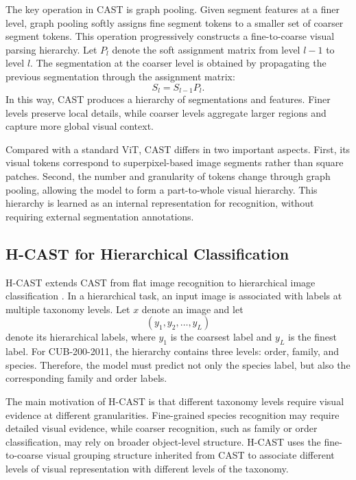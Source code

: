 The key operation in CAST is graph pooling. Given segment features at a finer level, graph pooling softly assigns fine segment tokens to a smaller set of coarser segment tokens. This operation progressively constructs a fine-to-coarse visual parsing hierarchy. Let \(P_l\) denote the soft assignment matrix from level \(l-1\) to level \(l\). The segmentation at the coarser level is obtained by propagating the previous segmentation through the assignment matrix:
\begin{equation}
    S_l = S_{l-1} P_l.
\end{equation}
In this way, CAST produces a hierarchy of segmentations and features. Finer levels preserve local details, while coarser levels aggregate larger regions and capture more global visual context.

Compared with a standard ViT, CAST differs in two important aspects. First, its visual tokens correspond to superpixel-based image segments rather than square patches. Second, the number and granularity of tokens change through graph pooling, allowing the model to form a part-to-whole visual hierarchy. This hierarchy is learned as an internal representation for recognition, without requiring external segmentation annotations.

\subsection{H-CAST for Hierarchical Classification}

H-CAST extends CAST from flat image recognition to hierarchical image classification \cite{park2025visually}. In a hierarchical task, an input image is associated with labels at multiple taxonomy levels. Let \(x\) denote an image and let
\begin{equation}
    (y_1, y_2, \ldots, y_L)
\end{equation}
denote its hierarchical labels, where \(y_1\) is the coarsest label and \(y_L\) is the finest label. For CUB-200-2011, the hierarchy contains three levels: order, family, and species. Therefore, the model must predict not only the species label, but also the corresponding family and order labels.

The main motivation of H-CAST is that different taxonomy levels require visual evidence at different granularities. Fine-grained species recognition may require detailed visual evidence, while coarser recognition, such as family or order classification, may rely on broader object-level structure. H-CAST uses the fine-to-coarse visual grouping structure inherited from CAST to associate different levels of visual representation with different levels of the taxonomy.


